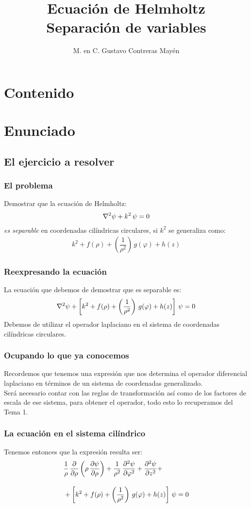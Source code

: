 \documentclass[12pt]{beamer}
\date{}
\title{Ecuación de Helmholtz \\ \Large{Separación de variables}}
\author{M. en C. Gustavo Contreras Mayén}
\begin{document}
\maketitle
\fontsize{14}{14}\selectfont
{}

\section*{Contenido}

\section{Enunciado}
\subsection{El ejercicio a resolver}

\begin{frame}
\frametitle{El problema}
Demostrar que la ecuación de Helmholtz:
\begin{align*}
\laplacian{\psi} + k^{2} \, \psi = 0
\end{align*}
\emph{es separable} en coordenadas cilíndricas circulares, \pause si $k^{2}$ se generaliza como:
\pause
\begin{align*}
k^{2} + f(\rho) + \left( \dfrac{1}{\rho^{2}} \right) \, g(\varphi) + h(z)
\end{align*}
\end{frame}
\begin{frame}
\frametitle{Reexpresando la ecuación}
La ecuación que debemos de demostrar que es separable es:
\begin{align*}
\laplacian{\psi} + \left[ k^{2} + f(\rho) + \left( \dfrac{1}{\rho^{2}} \right) \, g(\varphi) + h(z) \right] \, \psi = 0
\end{align*}
\pause
Debemos de utilizar el operador laplaciano en el sistema de coordenadas cilíndricas circulares.
\end{frame}
\begin{frame}
\frametitle{Ocupando lo que ya conocemos}
Recordemos que tenemos una expresión que nos determina el operador diferencial laplaciano en términos de un sistema de coordenadas generalizado.
\\
\bigskip
\pause
Será necesario contar con las reglas de transformación así como de los factores de escala de ese sistema, para obtener el operador, todo esto lo recuperamos del Tema 1.
\end{frame}
\begin{frame}
\frametitle{La ecuación en el sistema cilíndrico}
Tenemos entonces que la expresión resulta ser:
\pause
\begin{align*}
&{} \dfrac{1}{\rho} \, \pdv{\rho} \left( \rho \, \pdv{\psi}{\rho} \right) + \dfrac{1}{\rho^{2}} \, \pdv[2]{\psi}{\varphi} + \pdv[2]{\psi}{z} + \\[1em]
&+ \left[ k^{2} + f(\rho) + \left( \dfrac{1}{\rho^{2}} \right) \, g(\varphi) + h(z) \right] \, \psi = 0
\end{align*}
\end{frame}
\end{document}

